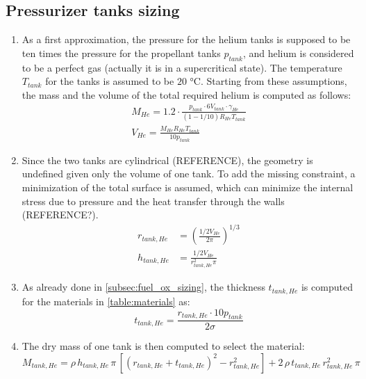 \subsection{Pressurizer tanks sizing}
\label{subsec:helium_sizing}

\begin{enumerate}[itemsep=5mm]
    \item
    As a first approximation, the pressure for the helium tanks is supposed to be ten times the pressure for the propellant tanks $p_{tank}$, and helium is considered to be a perfect gas (actually it is in a supercritical state).
    The temperature $T_{tank}$ for the tanks is assumed to be $20$ °C. Starting from these assumptions, the mass and the volume of the total required helium is computed as follows:
    \begin{gather}
        M_{He} = 1.2 \cdot \frac{p_{tank} \cdot 6 V_{tank} \cdot \gamma_{He}}{\left( 1 - 1/10 \right) R_{He} T_{tank}}
        \\
        V_{He} = \frac{M_{He} R_{He} T_{tank}}{10 p_{tank}}
    \end{gather}

    \item
    Since the two tanks are cylindrical (REFERENCE), the geometry is undefined given only the volume of one tank. To add the missing constraint, a minimization of the total surface is assumed, which can minimize the internal stress due to pressure and the heat transfer through the walls (REFERENCE?).
    \begin{align}
        r_{tank,He} &= \left( \frac{1/2 V_{He}}{2 \pi} \right)^{1/3}
        \\
        h_{tank,He} &= \frac{1/2 V_{He}}{r_{tank,He}^2 \pi}
    \end{align}

    \item
    As already done in \autoref{subsec:fuel_ox_sizing}, the thickness $t_{tank,He}$ is computed for the materials in \autoref{table:materials} as:
    \begin{equation}
        t_{tank,He} = \frac{r_{tank,He} \cdot 10 p_{tank}}{2 \sigma}
    \end{equation}

    \item
    The dry mass of one tank is then computed to select the material:
    \begin{equation}
        M_{tank,He} = \rho \, h_{tank,He} \, \pi \, \left[ \left( r_{tank,He} + t_{tank,He} \right)^2 - r_{tank,He}^2 \right] + 2 \, \rho \, t_{tank,He} \, r_{tank,He}^2 \, \pi
    \end{equation}
\end{enumerate}

